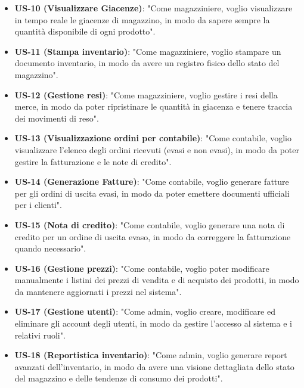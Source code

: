 \documentclass[a4paper,12pt]{article}
\begin{document}
\begin{itemize}
    \item \textbf{US-10 (Visualizzare Giacenze)}: "Come magazziniere, voglio visualizzare in tempo reale le giacenze di magazzino, in modo da sapere sempre la quantità disponibile di ogni prodotto".
    \item \textbf{US-11 (Stampa inventario)}: "Come magazziniere, voglio stampare un documento inventario, in modo da avere un registro fisico dello stato del magazzino".
    \item \textbf{US-12 (Gestione resi)}: "Come magazziniere, voglio gestire i resi della merce, in modo da poter ripristinare le quantità in giacenza e tenere traccia dei movimenti di reso".
    \item \textbf{US-13 (Visualizzazione ordini per contabile)}: "Come contabile, voglio visualizzare l'elenco degli ordini ricevuti (evasi e non evasi), in modo da poter gestire la fatturazione e le note di credito".
    \item \textbf{US-14 (Generazione Fatture)}: "Come contabile, voglio generare fatture per gli ordini di uscita evasi, in modo da poter emettere documenti ufficiali per i clienti".
    \item \textbf{US-15 (Nota di credito)}: "Come contabile, voglio generare una nota di credito per un ordine di uscita evaso, in modo da correggere la fatturazione quando necessario".
    \item \textbf{US-16 (Gestione prezzi)}: "Come contabile, voglio poter modificare manualmente i listini dei prezzi di vendita e di acquisto dei prodotti, in modo da mantenere aggiornati i prezzi nel sistema".
    \item \textbf{US-17 (Gestione utenti)}: "Come admin, voglio creare, modificare ed eliminare gli account degli utenti, in modo da gestire l'accesso al sistema e i relativi ruoli".
    \item \textbf{US-18 (Reportistica inventario)}: "Come admin, voglio generare report avanzati dell'inventario, in modo da avere una visione dettagliata dello stato del magazzino e delle tendenze di consumo dei prodotti".
\end{itemize}
\end{document}
